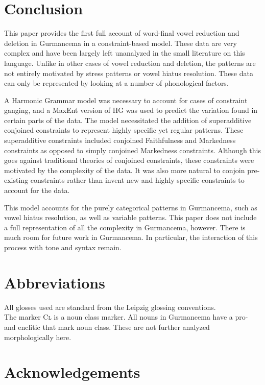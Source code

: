 \documentclass[output=paper,newtxmath,modfonts,nonflat,draftmode]{langsci/langscibook}
\begin{document}
\section{Conclusion}

This paper provides the first full account of word-final vowel reduction and deletion in Gurmancema in a constraint-based model. These data are very complex and have been largely left unanalyzed in the small literature on this language. Unlike in other cases of vowel reduction and deletion, the patterns are not entirely motivated by stress patterns or vowel hiatus resolution. These data can only be represented by looking at a number of phonological factors.  
	
A Harmonic Grammar model was necessary to account for cases of constraint ganging, and a MaxEnt version of HG was used to predict the variation found in certain parts of the data. The model necessitated the addition of superadditive conjoined constraints to represent highly specific yet regular patterns. These superadditive constraints included conjoined Faithfulness and Markedness constraints as opposed to simply conjoined Markedness constraints. Although this goes against traditional theories of conjoined constraints, these constraints were motivated by the complexity of the data. It was also more natural to conjoin pre-existing constraints rather than invent new and highly specific constraints to account for the data.   

This model accounts for the purely categorical patterns in Gurmancema, such as vowel hiatus resolution, as well as variable patterns. This paper does not include a full representation of all the complexity in Gurmancema, however. There is much room for future work in Gurmancema. In particular, the interaction of this process with tone and syntax remain. 

\section*{Abbreviations}
All glosses used are standard from the Leipzig glossing conventions. \\
The marker \textsc{Cl} is a noun class marker. All nouns in Gurmancema have a 
pro- and enclitic that mark noun class. These are not further analyzed 
morphologically here. 

\section*{Acknowledgements}
\end{document}
